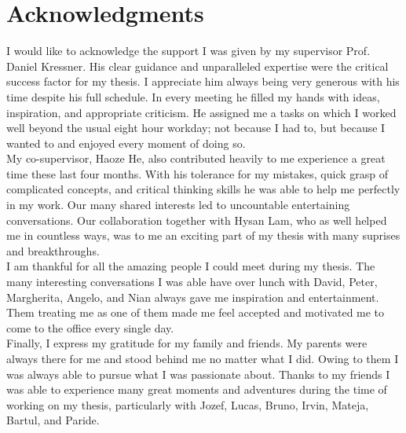 \chapter*{Acknowledgments}
\label{chp:0-acknowledgments}

I would like to acknowledge the support I was given by my supervisor
Prof. Daniel Kressner. His clear guidance and unparalleled expertise were the
critical success factor for my thesis. I appreciate him always being very generous
with his time despite his full schedule. In every meeting he filled my hands with
ideas, inspiration, and appropriate criticism. He assigned me a tasks on which
I worked well beyond the usual eight hour workday; not because I had to, but because
I wanted to and enjoyed every moment of doing so.\\ %

My co-supervisor, Haoze He, also contributed heavily to me experience a great time
these last four months. With his tolerance for my mistakes, quick grasp of
complicated concepts, and critical thinking skills he was able to help me
perfectly in my work. Our many shared interests led to uncountable
entertaining conversations. Our collaboration together with Hysan Lam, who
as well helped me in countless ways, was to me an exciting part of my thesis
with many suprises and breakthroughs.\\

I am thankful for all the amazing people I could meet during my thesis.
The many interesting conversations I was able have over lunch with David, Peter,
Margherita, Angelo, and Nian always gave me inspiration and entertainment.
Them treating me as one of them made me feel accepted and motivated me to come
to the office every single day.\\

Finally, I express my gratitude for my family and friends.
My parents were always there for me and stood behind me no matter what I did.
Owing to them I was always able to pursue what I was passionate about.
Thanks to my friends I was able to experience many great moments and adventures
during the time of working on my thesis, particularly with Jozef, Lucas, Bruno,
Irvin, Mateja, Bartul, and Paride.
